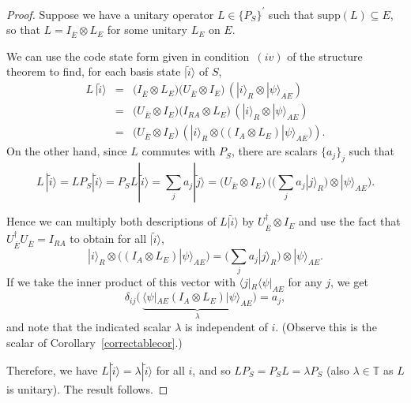 \documentclass[11pt]{amsart}
\theoremstyle{definition}
\theoremstyle{definition}
\theoremstyle{definition}
\newcommand{\1}{\mathbb{I}}
\def\ket#1{| #1 \rangle}
\def\bra#1{\langle #1 |}
\begin{document}
\begin{proof}
Suppose we have a unitary operator $L\in \{ P_S \}^\prime$ such that $\mathrm{supp}(L)\subseteq E$, so that $L = I_{\overline{E}} \otimes L_E$ for some unitary $L_E$ on $E$. 

We can use the code state form given in condition~$(iv)$ of the structure theorem to find, for each basis state $ \ket{\widetilde{i}}$ of $S$, 
\begin{eqnarray*}
 L  \, \ket{\widetilde{i}} &=& \big( I_{\overline{E}} \otimes L_E \big) \big( U_{\overline{E}} \otimes I_E \big) \, ( \ket{i}_R \otimes \ket{\psi}_{A E}) \\ 
 &=&  \big( U_{\overline{E}} \otimes I_E \big) \big( I_{RA} \otimes L_E \big) \, ( \ket{i}_R \otimes \ket{\psi}_{A E}) \\ 
  &=&  \big( U_{\overline{E}} \otimes I_E \big) \, ( \ket{i}_R \otimes \big( ( I_{A} \otimes L_E   ) \ket{\psi}_{A E}\big) ) . 
\end{eqnarray*}
On the other hand, since $L$ commutes with $P_S$, there are scalars $\{a_j\}_j$ such that 
\[
L  \, \ket{\widetilde{i}} = L P_S \ket{\widetilde{i}} = P_S L   \ket{\widetilde{i}} = \sum_j a_j  \ket{\widetilde{j}} = \big( U_{\overline{E}} \otimes I_E \big) \, \big( \big( \sum_j a_j \ket{j}_R \big) \otimes \ket{\psi}_{A E} \big).  
\]

Hence we can multiply both descriptions of $L\ket{\widetilde{i}}$ by $U_{\overline{E}}^\dagger \otimes I_E$ and use the fact that $U_{\overline{E}}^\dagger U_{\overline{E}} = I_{RA}$ to obtain for all $ \ket{\widetilde{i}}$, 
\[
\ket{i}_R \otimes \big( ( I_{A} \otimes L_E   ) \ket{\psi}_{A E}\big) = 
\Big( \sum_j a_j \ket{j}_R \Big) \otimes \ket{\psi}_{A E} . 
\]
If we take the inner product of this vector with $\bra{j}_R\bra{\psi}_{AE}$ for any $j$, we get 
\[
\delta_{ij} \big( \,   \underbrace{\bra{\psi}_{AE} (I_{A} \otimes L_E   ) \ket{\psi}_{A E}}_{\lambda} \big) = a_j, 
\]
and note that the indicated scalar $\lambda$ is independent of $i$. (Observe this is the scalar of Corollary~\ref{correctablecor}.) 

Therefore,  we have $L \ket{\widetilde{i}} = \lambda \ket{\widetilde{i}}$ for all $i$, and so $LP_S = P_S L = \lambda P_S$ (also $\lambda\in\mathbb{T}$ as $L$ is unitary). The result follows.  
\end{proof}
\end{document}
